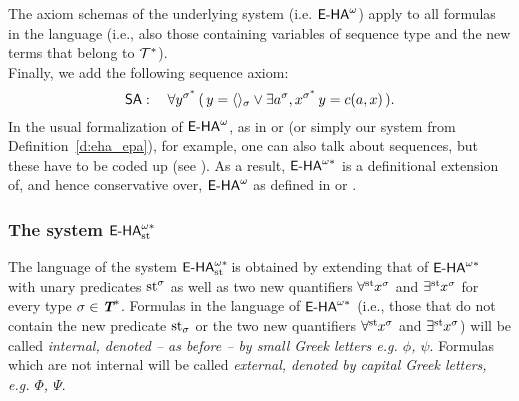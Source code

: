 The axiom schemas of the underlying system (i.e. ${\textsf{\upshape E-HA}}^\omega$) apply to all formulas in the language (i.e., also those containing variables of sequence type and the new terms that belong to $\mathcal{T}^*$).\\
Finally, we add the following sequence axiom:
\[ \textsf{\upshape SA}: \quad \forall y^{\sigma^*} \, ( \, y = \langle\rangle_\sigma \lor \exists a^\sigma, x^{\sigma^*} \, y = c(a,x) \, ). \]
In the usual formalization of ${\textsf{\upshape E-HA}}^\omega$, as in \cite{Kohlenbach08} or \cite{troelstravandalen88b} (or simply our system from Definition~\ref{d:eha_epa}), for example, one can also talk about sequences, but these have to be coded up (see \cite[p. 59]{Kohlenbach08}). As a result, ${\textsf{\upshape E-HA}}^{\omega*}$ is a definitional extension of, and hence conservative over, ${\textsf{\upshape E-HA}}^\omega$ as defined in \cite{Kohlenbach08} or \cite{troelstravandalen88b}.

\subsubsection*{The system ${\textsf{\upshape E-HA}}^{\omega*}_{\operatorname{st}{}}\!$}

\begin{dfn} The language of the system ${\textsf{\upshape E-HA}}^{\omega*}_{\operatorname{st}{}}\!$ is obtained by extending that of ${\textsf{\upshape E-HA}}^{\omega*}$ with unary predicates $\operatorname{st}^\sigma$ as well as two new quantifiers $\forall^{\operatorname{st}{}}\! x^\sigma$ and $\exists^{\operatorname{st}{}}\! x^\sigma$ for every type $\sigma \in \emph{\protect\textbf{T}}^*$. Formulas in the language of ${\textsf{\upshape E-HA}}^{\omega*}$ (i.e., those that do not contain the new predicate $\operatorname{st}_\sigma$ or the two new quantifiers $\forall^{\operatorname{st}{}}\! x^\sigma$ and $\exists^{\operatorname{st}{}}\! x^\sigma$) will be called \emph{internal, denoted -- as before -- by small Greek letters e.g. $\phi$, $\psi$}. Formulas which are not internal will be called \emph{external, denoted by capital Greek letters, e.g. $\Phi$, $\Psi$}.
\end{dfn}

